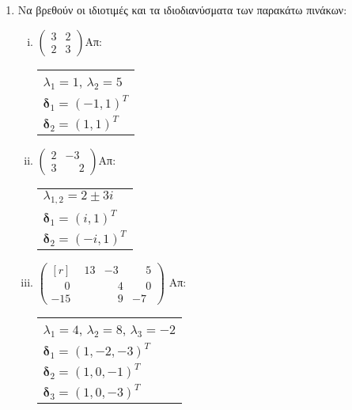 



\thispagestyle{empty}





\begin{center}
\end{center}

\vspace{\baselineskip}

\begin{enumerate}

\item Να βρεθούν οι ιδιοτιμές και τα ιδιοδιανύσματα των παρακάτω πινάκων:

\begin{enumerate}[i)]

\item $\begin{pmatrix}
3 & 2 \\
2 & 3
\end{pmatrix}$\hfill Απ: \begin{tabular}{l}
$\lambda_1=1$, $\lambda_2=5$ \\
$\bm{\delta}_1=(-1,1)^T$ \\
$\bm{\delta}_2=(1,1)^T$
\end{tabular}

\item $\begin{pmatrix}
2 & -3 \\
3 & \phantom{-}2
\end{pmatrix}$\hfill Απ: \begin{tabular}{l}
$\lambda_{1,2}=2\pm 3i$ \\
$\bm{\delta}_1=(i,1)^T$ \\
$\bm{\delta}_2=(-i,1)^T$
\end{tabular}

\item $\begin{pmatrix*}[r]
\phantom{-}13 & -3 & \phantom{-}5 \\
\phantom{-}0 & \phantom{-}4 & \phantom{-}0 \\
-15 & \phantom{-}9 & -7
\end{pmatrix*}$ \hfill Απ: \begin{tabular}{l}
$\lambda_1=4$, $\lambda_2=8$, $\lambda_3=-2$ \\ 
$\bm{\delta}_1=(1,-2,-3)^T$ \\
$\bm{\delta}_2=(1,0,-1)^T$ \\
$\bm{\delta}_3=(1,0,-3)^T$
\end{tabular}


\end{enumerate}
\end{enumerate}
